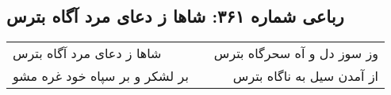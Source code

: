 \begin{center}
\section*{رباعی شماره ۳۶۱: شاها ز دعای مرد آگاه بترس}
\label{sec:sh361}
\begin{longtable}{l p{0.5cm} r}
شاها ز دعای مرد آگاه بترس
&&
وز سوز دل و آه سحرگاه بترس
\\
بر لشکر و بر سپاه خود غره مشو
&&
از آمدن سیل به ناگاه بترس
\\
\end{longtable}
\end{center}
